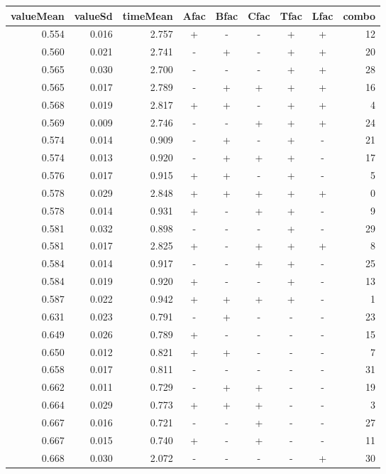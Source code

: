\documentclass[11pt]{article}
\begin{document}
\begin{table}[ht]
\centering
\begin{tabular}{rrrcccccr}
  \hline
valueMean & valueSd & timeMean & Afac & Bfac & Cfac & Tfac & Lfac & combo \\ 
  \hline
0.554 & 0.016 & 2.757 & + & - & - & + & + & 12 \\ 
  0.560 & 0.021 & 2.741 & - & + & - & + & + & 20 \\ 
  0.565 & 0.030 & 2.700 & - & - & - & + & + & 28 \\ 
  0.565 & 0.017 & 2.789 & - & + & + & + & + & 16 \\ 
  0.568 & 0.019 & 2.817 & + & + & - & + & + & 4 \\ 
  0.569 & 0.009 & 2.746 & - & - & + & + & + & 24 \\ 
  0.574 & 0.014 & 0.909 & - & + & - & + & - & 21 \\ 
  0.574 & 0.013 & 0.920 & - & + & + & + & - & 17 \\ 
  0.576 & 0.017 & 0.915 & + & + & - & + & - & 5 \\ 
  0.578 & 0.029 & 2.848 & + & + & + & + & + & 0 \\ 
  0.578 & 0.014 & 0.931 & + & - & + & + & - & 9 \\ 
  0.581 & 0.032 & 0.898 & - & - & - & + & - & 29 \\ 
  0.581 & 0.017 & 2.825 & + & - & + & + & + & 8 \\ 
  0.584 & 0.014 & 0.917 & - & - & + & + & - & 25 \\ 
  0.584 & 0.019 & 0.920 & + & - & - & + & - & 13 \\ 
  0.587 & 0.022 & 0.942 & + & + & + & + & - & 1 \\ 
  0.631 & 0.023 & 0.791 & - & + & - & - & - & 23 \\ 
  0.649 & 0.026 & 0.789 & + & - & - & - & - & 15 \\ 
  0.650 & 0.012 & 0.821 & + & + & - & - & - & 7 \\ 
  0.658 & 0.017 & 0.811 & - & - & - & - & - & 31 \\ 
  0.662 & 0.011 & 0.729 & - & + & + & - & - & 19 \\ 
  0.664 & 0.029 & 0.773 & + & + & + & - & - & 3 \\ 
  0.667 & 0.016 & 0.721 & - & - & + & - & - & 27 \\ 
  0.667 & 0.015 & 0.740 & + & - & + & - & - & 11 \\ 
  0.668 & 0.030 & 2.072 & - & - & - & - & + & 30 \\ 

\end{tabular}
\end{table}
\end{document}
